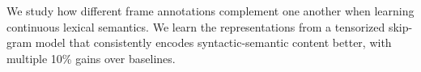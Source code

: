 We study how different frame annotations complement one another when learning continuous lexical semantics. We learn the representations from a tensorized skip-gram model that consistently encodes syntactic-semantic content better, with multiple 10\% gains over baselines.
